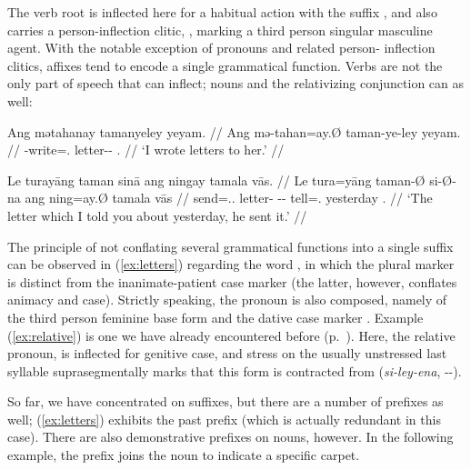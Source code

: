 The verb root  is inflected here for a habitual action
with the suffix , and also carries a person-inflection
clitic, , marking a third person singular
masculine agent. With the notable exception of pronouns and related person-
inflection clitics, affixes tend to encode a single grammatical function. Verbs
are not the only part of speech that can inflect; nouns and the relativizing
conjunction can as well:

\pex
\a\label{ex:letters}\begingl
	\gla Ang mətahanay tamanyeley yeyam. //
	\glb Ang mə-tahan=ay.Ø taman-ye-ley yeyam. //
	\glc \AgtT{} \Pst{}-write=\Fsg{}.\Top{} letter-\Pl{}-\PargI{} 
		\TsgF{}.\Dat{} //
	\glft `I wrote letters to her.' //
\endgl

\a\label{ex:relative}\begingl
	\gla Le turayāng taman sinā ang ningay tamala vās. //
	\glb Le tura=yāng taman-Ø si-Ø-na ang ning=ay.Ø tamala vās //
	\glc \PatTI{} send=\Tsg{}.\M{}.\Aarg{} letter-\Top{} 
		\Rel{}-\PatTI{}-\Gen{} \AgtT{} tell=\Fsg{}.\Top{} yesterday 
		\Ssg{}.\Parg{} //
	\glft `The letter which I told you about yesterday, he sent it.' //
\endgl
\xe

The principle of not conflating several grammatical functions into a single
suffix can be observed in (\ref{ex:letters}) regarding the word
, in which the plural marker 
 is distinct from the inanimate-patient case marker 
 (the latter, however, conflates animacy and case). Strictly 
speaking, the pronoun  is also composed, namely of
the third person feminine base form  and the dative case marker
. Example (\ref{ex:relative}) is one we have already 
encountered before (p.~\pageref{doublerel}). Here, the relative pronoun,
 is inflected for genitive case, and 
stress on the usually unstressed last syllable
suprasegmentally marks that this form is contracted from
 (\textit{si-ley-ena}, \Rel{}-\PargI{}-\Gen{}).

So far, we have concentrated on suffixes, but there are a number of 
prefixes as well; (\ref{ex:letters}) exhibits the past prefix 
 (which is actually redundant in this case). There are also 
demonstrative prefixes on nouns, however. In the following example, the prefix 
 joins the noun  to indicate 
a specific carpet.

